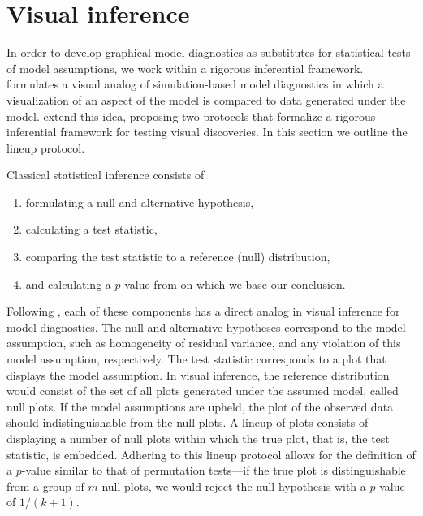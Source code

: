 \documentclass{article} %
\begin{document}
\section{Visual inference}\label{sec:vi}
In order to develop graphical model diagnostics as substitutes for statistical tests of model assumptions, we work within a rigorous inferential framework. \cite{Gelman:2004gg} formulates a visual analog of simulation-based model diagnostics in which a visualization of an aspect of the model is compared to data generated under the model. \cite{Buja:2009hp} extend this idea, proposing two protocols that formalize a rigorous inferential framework for testing visual discoveries. In this section we outline the lineup protocol.

Classical statistical inference consists of 
\begin{enumerate}
	\item formulating a null and alternative hypothesis,
	\item calculating a test statistic,
	\item comparing the test statistic to a reference (null) distribution,
	\item and calculating a $p$-value from on which we base our conclusion.
\end{enumerate}
Following \citeauthor{Buja:2009hp}, each of these components has a direct analog in visual inference for model diagnostics. The null and alternative hypotheses correspond to the model assumption, such as homogeneity of residual variance, and any violation of this model assumption, respectively. The test statistic corresponds to a plot that displays the model assumption. In visual inference, the reference distribution would consist of the set of all plots generated under the assumed model, called null plots. If the model assumptions are upheld, the plot of the observed data should indistinguishable from the null plots. A lineup of plots consists of displaying a number of null plots within which the true plot, that is, the test statistic, is embedded. Adhering to this lineup protocol allows for the definition of a $p$-value similar to that of permutation tests---if the true plot is distinguishable from a group of $m$ null plots, we would reject the null hypothesis with a $p$-value of $1 / (k + 1)$.

\end{document}
